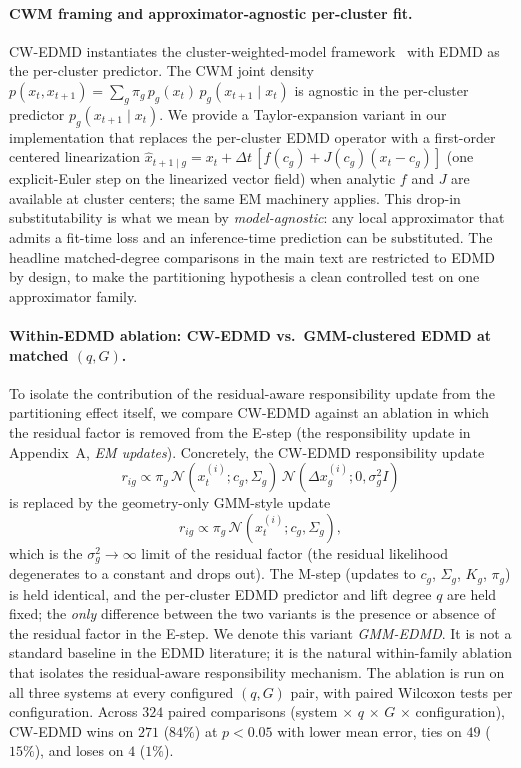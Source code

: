 \documentclass{article}
\begin{document}
\paragraph{CWM framing and approximator-agnostic per-cluster fit.} CW-EDMD instantiates the cluster-weighted-model framework~\citep{gershenfeld1999nature,ingrassia2014linear,punzo2014polynomial} with EDMD as the per-cluster predictor. The CWM joint density $p(x_t, x_{t+1}) = \sum_g \pi_g\, p_g(x_t)\, p_g(x_{t+1}\mid x_t)$ is agnostic in the per-cluster predictor $p_g(x_{t+1}\mid x_t)$. We provide a Taylor-expansion variant in our implementation that replaces the per-cluster EDMD operator with a first-order centered linearization $\hat{x}_{t+1\mid g} = x_t + \Delta t\,[f(c_g) + J(c_g)(x_t - c_g)]$ (one explicit-Euler step on the linearized vector field) when analytic $f$ and $J$ are available at cluster centers; the same EM machinery applies. This drop-in substitutability is what we mean by \emph{model-agnostic}: any local approximator that admits a fit-time loss and an inference-time prediction can be substituted. The headline matched-degree comparisons in the main text are restricted to EDMD by design, to make the partitioning hypothesis a clean controlled test on one approximator family.

\paragraph{Within-EDMD ablation: CW-EDMD vs.\ GMM-clustered EDMD at matched $(q, G)$.} To isolate the contribution of the residual-aware responsibility update from the partitioning effect itself, we compare CW-EDMD against an ablation in which the residual factor is removed from the E-step (the responsibility update in Appendix~A, \emph{EM updates}). Concretely, the CW-EDMD responsibility update
\[
r_{ig} \propto \pi_g\, \mathcal{N}(x_t^{(i)}; c_g, \Sigma_g)\, \mathcal{N}(\Delta x_g^{(i)}; 0, \sigma_g^2 I)
\]
is replaced by the geometry-only GMM-style update
\[
r_{ig} \propto \pi_g\, \mathcal{N}(x_t^{(i)}; c_g, \Sigma_g),
\]
which is the $\sigma_g^2 \to \infty$ limit of the residual factor (the residual likelihood degenerates to a constant and drops out). The M-step (updates to $c_g$, $\Sigma_g$, $K_g$, $\pi_g$) is held identical, and the per-cluster EDMD predictor and lift degree $q$ are held fixed; the \emph{only} difference between the two variants is the presence or absence of the residual factor in the E-step. We denote this variant \emph{GMM-EDMD}. It is not a standard baseline in the EDMD literature; it is the natural within-family ablation that isolates the residual-aware responsibility mechanism. The ablation is run on all three systems at every configured $(q, G)$ pair, with paired Wilcoxon tests per configuration. Across $324$ paired comparisons (system $\times$ $q$ $\times$ $G$ $\times$ configuration), CW-EDMD wins on $271$ ($84\%$) at $p<0.05$ with lower mean error, ties on $49$ ($15\%$), and loses on $4$ ($1\%$).
\end{document}
